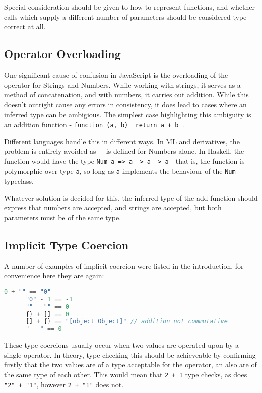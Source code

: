 \documentclass[british, twoside]{bhamthesis}
\theoremstyle{definition}
\begin{document}
    Special consideration should be given to how to represent functions, and whether calls which supply a different number of parameters should be considered type-correct at all.

  \subsection{Operator Overloading}
    One significant cause of confusion in JavaScript is the overloading of the $+$ operator for Strings and Numbers. While working with strings, it serves as a method of concatenation, and with numbers, it carries out addition. While this doesn't outright cause any errors in consistency, it does lead to cases where an inferred type can be ambigious. The simplest case highlighting this ambiguity is an addition function - \texttt {function (a, b) { return a + b }}.

    Different languages handle this in different ways. In ML and derivatives, the problem is entirely avoided as + is defined for Numbers alone. In Haskell, the function would have the type \texttt {Num a => a -> a -> a} - that is, the function is polymorphic over type \texttt{a}, so long as \texttt{a} implements the behaviour of the \texttt{Num} typeclass.

    Whatever solution is decided for this, the inferred type of the add function should express that numbers are accepted, and strings are accepted, but both parameters must be of the same type.

  \subsection{Implicit Type Coercion}
    A number of examples of implicit coercion were listed in the introduction, for convenience here they are again:

    \begin{lstlisting}[language=JavaScript]
      0 + "" == "0"
      "0" - 1 == -1
      "" - "" == 0
      {} + [] == 0
      [] + {} == "[object Object]" // addition not commutative
      "   " == 0
    \end{lstlisting}

    These type coercions usually occur when two values are operated upon by a single operator. In theory, type checking this should be achieveable by confirming firstly that the two values are of a type acceptable for the operator, an also are of the same type of each other. This would mean that \texttt{2 + 1} type checks, as does \texttt{"2" + "1"}, however \texttt{2 + "1"} does not.
\end{document}
